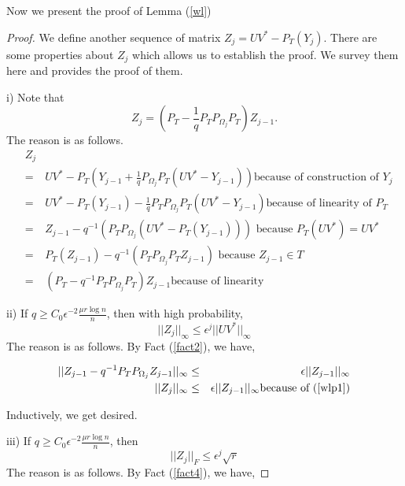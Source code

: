 Now we present the proof of Lemma (\ref{wl})

\begin{proof}
We define another sequence of matrix $Z_{j}=UV^{*}-P_{T}(Y_{j})$. There are some properties about $Z_{j}$ which allows us to establish the proof. We survey them here and provides the proof of them.

i) Note that 
\begin{equation}
Z_{j}=(P_{T}-\frac{1}{q}P_{T}P_{\Omega_{j}}P_{T})Z_{j-1}. \label{wlp1}
\end{equation}
The reason is as follows.
\begin{eqnarray*}
 & Z_{j}\\
 & = & UV^{*}-P_{T}(Y_{j-1}+\frac{1}{q}P_{\Omega_{j}}P_{T}(UV^{*}-Y_{j-1})) \text{because of construction of } Y_j \\
 & = & UV^{*}-P_{T}(Y_{j-1})-\frac{1}{q}P_{T}P_{\Omega_{j}}P_{T}(UV^{*}-Y_{j-1}) \text{because of linearity of }P_{T}\\
 & = & Z_{j-1}-q^{-1}(P_{T}P_{\Omega_{j}}(UV^{*}-P_{T}(Y_{j-1})))\text{ because }P_{T}(UV^{*})=UV^{*}\\
 & = & P_{T}(Z_{j-1})-q^{-1}(P_{T}P_{\Omega_{j}}P_{T}Z_{j-1})\text{ because }Z_{j-1}\in T\\
 & = & (P_{T}-q^{-1}P_{T}P_{\Omega_{j}}P_{T})Z_{j-1}\text{because of linearity }
\end{eqnarray*}


ii) If $q\ge C_{0}\epsilon^{-2}\frac{\mu r\log n}{n}$, then  with high probability, 
\begin{equation} 
||Z_{j}||_{\infty}\le\epsilon^{j}||UV^{*}||_{\infty} \label{wlp2}
\end{equation}
 The reason is as follows. By Fact (\ref{fact2}), we have,

\begin{eqnarray*}
||Z_{j-1}-q^{-1}P_{T}P_{\Omega_{j}}Z_{j-1}||_{\infty} & \le & \epsilon||Z_{j-1}||_{\infty} \\
||Z_{j}||_{\infty} & \le & \epsilon||Z_{j-1}||_{\infty} \text{because of (\ref{wlp1})}
\end{eqnarray*}


Inductively, we get desired.

iii) If $q\ge C_{0}\epsilon^{-2}\frac{\mu r\log n}{n}$, then 
\begin{equation} 
||Z_{j}||_{F}\le\epsilon^{j}\sqrt{r}  \label{wlp3}
\end{equation} 
The reason is as follows. By Fact (\ref{fact4}), we have,


\end{proof}
